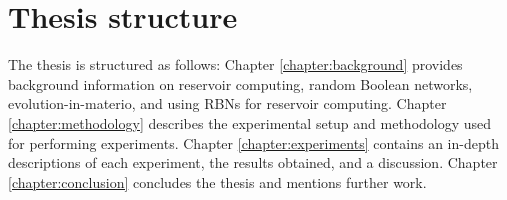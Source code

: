 \section{Thesis structure}

The thesis is structured as follows:
Chapter \ref{chapter:background} provides background information on reservoir computing, random Boolean networks, evolution-in-materio, and using RBNs for reservoir computing.
Chapter \ref{chapter:methodology} describes the experimental setup and methodology used for performing experiments.
Chapter \ref{chapter:experiments} contains an in-depth descriptions of each experiment, the results obtained, and a discussion.
Chapter \ref{chapter:conclusion} concludes the thesis and mentions further work.
